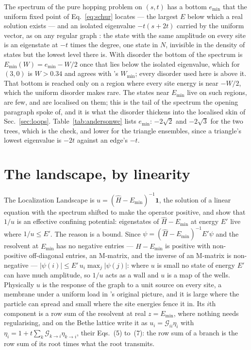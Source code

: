 The spectrum of the pure hopping problem on $(s,t)$ has a bottom $e_{\min}$
that the uniform fixed point of Eq.~\eqref{eq:schur} locates --- the largest
$E$ below which a real solution exists --- and an isolated eigenvalue
$-t(s+2t)$ carried by the uniform vector, as on any regular graph
\citep{biroli2010}: the state with the same amplitude on every site is an
eigenstate at $-t$ times the degree, one state in $N$, invisible in the
density of states but the lowest level there is. With disorder the bottom
of the spectrum is $E_{\min}(W)=e_{\min}-W/2$ once that lies below the
isolated eigenvalue, which for $(3,0)$ is $W>0.34$ and agrees with
\citeauthor{tonetti2026}'s $W_{\min}$; every disorder used here is above
it. That bottom is reached only on a region where every site energy is
near $-W/2$, which the uniform disorder makes rare. The states near
$E_{\min}$ live on such regions, are few, and are localised on them; this
is the tail of the spectrum the opening paragraph spoke of, and it is
what the disorder thickens into the localised skin of
Sec.~\ref{sec:loops}. Table~\ref{tab:andersonwc}
lists $e_{\min}$: $-2\sqrt2$ and $-2\sqrt3$ for the two trees, which is the
check, and lower for the triangle ensembles, since a triangle's lowest
eigenvalue is $-2t$ against an edge's $-t$.

\section{The landscape, by linearity}
\label{sec:landscape}

The Localization Landscape is $u=(\hat H-E_{\min})^{-1}\mathbf{1}$, the
solution of a linear equation with the spectrum shifted to make the
operator positive, and \citet{arnold2016} show that $1/u$ is an effective
confining potential: eigenstates of $\hat H-E_{\min}$ at energy $E'$ live
where $1/u\le E'$. The reason is a bound. Since
$\psi=(\hat H-E_{\min})^{-1}E'\psi$ and the resolvent at $E_{\min}$ has
no negative entries --- $\hat H-E_{\min}$ is positive with non-positive
off-diagonal entries, an M-matrix, and the inverse of an M-matrix is
non-negative --- $|\psi(i)|\le E'\,u_{i}\max_{j}|\psi(j)|$: where
$u$ is small no state of energy $E'$ can have much amplitude, so $1/u$
acts as a wall and $u$ is a map of the wells. Physically $u$ is the
response of the graph to a unit source on every site, a membrane under a
uniform load in \citeauthor{filoche2012}'s original picture, and it is
large where the particle can spread and small where the site energies
fence it in. Its $i$th component is a row sum of the resolvent at real
$z=E_{\min}$, where nothing needs regularising, and on the Bethe
lattice \citeauthor{tonetti2026} write it as $u_{i}=\mathcal{G}_{ii}\eta_{i}$
with $\eta_{i}=1+t\sum_{k}\mathcal{G}_{k\to i}\eta_{k\to i}$, their Eqs.~(5)
to~(7): the row sum of a branch is the row sum of its root times what the
root transmits.

